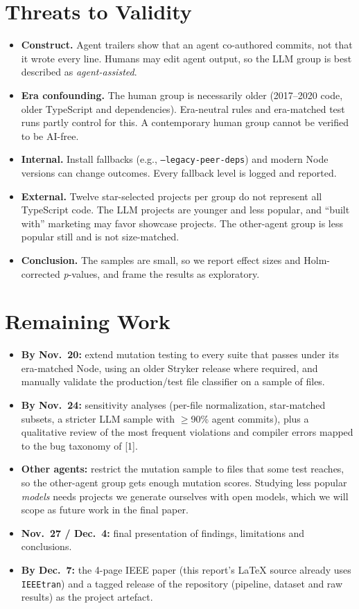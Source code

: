 \documentclass[10pt,conference]{IEEEtran}
\begin{document}
\section{Threats to Validity}
\begin{itemize}
\item \textbf{Construct.} Agent trailers show that an agent co-authored commits, not that it wrote every line. Humans may edit agent output, so the LLM group is best described as \emph{agent-assisted}.
\item \textbf{Era confounding.} The human group is necessarily older (2017--2020 code, older TypeScript and dependencies). Era-neutral rules and era-matched test runs partly control for this. A contemporary human group cannot be verified to be AI-free.
\item \textbf{Internal.} Install fallbacks (e.g., \texttt{--legacy-peer-deps}) and modern Node versions can change outcomes. Every fallback level is logged and reported.
\item \textbf{External.} Twelve star-selected projects per group do not represent all TypeScript code. The LLM projects are younger and less popular, and “built with” marketing may favor showcase projects. The other-agent group is less popular still and is not size-matched.
\item \textbf{Conclusion.} The samples are small, so we report effect sizes and Holm-corrected \emph{p}-values, and frame the results as exploratory.
\end{itemize}

\section{Remaining Work}
\begin{itemize}
\item \textbf{By Nov.~20:} extend mutation testing to every suite that passes under its era-matched Node, using an older Stryker release where required, and manually validate the production/test file classifier on a sample of files.
\item \textbf{By Nov.~24:} sensitivity analyses (per-file normalization, star-matched subsets, a stricter LLM sample with $\geq$90\% agent commits), plus a qualitative review of the most frequent violations and compiler errors mapped to the bug taxonomy of [1].
\item \textbf{Other agents:} restrict the mutation sample to files that some test reaches, so the other-agent group gets enough mutation scores. Studying less popular \emph{models} needs projects we generate ourselves with open models, which we will scope as future work in the final paper.
\item \textbf{Nov.~27 / Dec.~4:} final presentation of findings, limitations and conclusions.
\item \textbf{By Dec.~7:} the 4-page IEEE paper (this report's LaTeX source already uses \texttt{IEEEtran}) and a tagged release of the repository (pipeline, dataset and raw results) as the project artefact.
\end{itemize}
\end{document}
